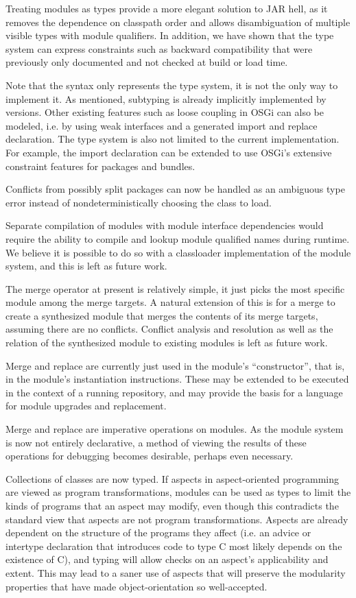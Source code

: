 Treating modules as types provide a more elegant solution to JAR hell, as it removes the dependence
on classpath order and allows disambiguation of multiple visible types with
module qualifiers. In addition, we have shown that the type system can express
constraints such as backward compatibility that were previously only documented 
and not checked at build or load time.

Note that the syntax only represents the type system, it is not the only way
to implement it. As mentioned, subtyping is already implicitly implemented
by versions. Other existing features such as loose coupling in OSGi can
also be modeled, i.e. by using weak interfaces and a generated import and replace
declaration. The type system is also not limited to
the current implementation. For example, the import declaration can be 
extended to use OSGi's extensive constraint features for packages and bundles.

Conflicts from possibly split packages can now be handled as an ambiguous type error 
instead of nondeterministically choosing the class to load.

Separate compilation of modules with module interface dependencies would require
the ability to compile and lookup module qualified names during runtime. We believe
it is possible to do so with a classloader implementation of the module system, and
this is left as future work.

The merge operator at present is relatively simple, it just picks the most specific module
among the merge targets. A natural extension of this is for a merge to create a 
synthesized module that merges the contents of its merge targets, assuming there are no
conflicts. Conflict analysis and resolution as well as the relation of the synthesized module
to existing modules is left as future work.

Merge and replace are currently just used in the module's ``constructor'', that is, in
the module's instantiation instructions. These may be extended to be executed in the context
of a running repository, and may provide the basis for a language for module upgrades and replacement.

Merge and replace are imperative operations on modules. As the module system
is now not entirely declarative, a method of viewing the results of these operations
for debugging becomes desirable, perhaps even necessary.

Collections of classes are now typed. If aspects in aspect-oriented programming are viewed as program transformations,
modules can be used as types to limit the kinds of programs that an aspect may modify, even though 
this contradicts the standard view that aspects are not program transformations. 
Aspects are already dependent on the structure of the programs they affect (i.e. 
an advice or intertype declaration that introduces code to type C most likely
depends on the existence of C), and typing will allow checks on an aspect's applicability
and extent.
This may lead to a saner use of aspects that will preserve the modularity properties
that have made object-orientation so well-accepted.

